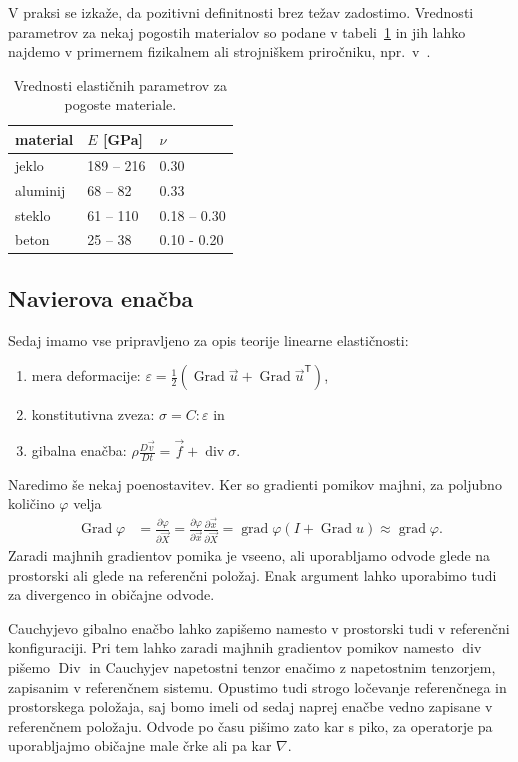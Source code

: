 \documentclass[12pt,a4paper,twoside]{article}
\theoremstyle{definition} %
\theoremstyle{plain} %
\numberwithin{equation}{section}
\newcommand{\T}{\mathsf{T}}
\renewcommand{\div}{\operatorname{div}}
\newcommand{\grad}{\operatorname{grad}}
\newcommand{\Div}{\operatorname{Div}}
\newcommand{\Grad}{\operatorname{Grad}}
\renewcommand{\phi}{\varphi}
\newcommand{\eps}{\varepsilon}
\newcommand{\dpar}[2]{\ensuremath{\frac{\partial #1}{\partial #2}}}
\newcommand{\DD}[2]{\ensuremath{\frac{D #1}{D #2}}}
\newcommand{\DDt}[1]{\DD{#1}{t}}
\newcommand{\vv}{\vec{v}}
\newcommand{\vu}{\vec{u}}
\newcommand{\vf}{\vec{f}}
\newcommand{\vX}{\vec{X}}
\newcommand{\vx}{\vec{x}}
\newcommand{\ts}{\sigma}
\begin{document}
V praksi se izkaže, da pozitivni definitnosti brez težav zadostimo. Vrednosti parametrov za nekaj
pogostih materialov so podane v tabeli~\ref{tab:Enu} in jih lahko najdemo v primernem fizikalnem ali
strojniškem priročniku, npr.~v~\cite[str.\ 11]{cambridge2003materials}.
\begin{table}[h]
  \centering
  \begin{tabular}{|l|l|l|} \hline
    material & $E$ [\unit{GPa}] & $\nu$ \\ \hline
    jeklo    & 189 -- 216 & 0.30 \\
    aluminij & 68 -- 82   & 0.33 \\
    steklo   & 61 -- 110  & 0.18 -- 0.30 \\
    beton    & 25 -- 38   & 0.10 - 0.20 \\ \hline
  \end{tabular}
  \caption{Vrednosti elastičnih parametrov za pogoste materiale.}
  \label{tab:Enu}
\end{table}

\subsection{Navierova enačba}
Sedaj imamo vse pripravljeno za opis teorije linearne elastičnosti:
\begin{enumerate}[\indent (1)]
  \item mera deformacije: $\eps = \frac12(\Grad \vu + \Grad \vu^\T)$,
  \item konstitutivna zveza: $\ts = C : \eps$ in
  \item gibalna enačba: $\rho \DDt{\vv} = \vf + \div \ts$.
\end{enumerate}

Naredimo še nekaj poenostavitev. Ker so gradienti pomikov majhni,
za poljubno količino $\phi$ velja
\begin{align}
  \Grad\phi &= \dpar{\phi}{\vX} = \dpar{\phi}{\vx} \dpar{\vx}{\vX} = \grad\phi
  (I + \Grad u) \approx \grad \phi.
\end{align}
Zaradi majhnih gradientov pomika je vseeno, ali uporabljamo odvode glede na
prostorski ali glede na referenčni položaj. Enak argument lahko uporabimo
tudi za divergenco in običajne odvode.

Cauchyjevo gibalno enačbo lahko zapišemo namesto v prostorski tudi v referenčni
konfiguraciji. Pri tem lahko zaradi majhnih gradientov pomikov namesto $\div$
pišemo $\Div$ in Cauchyjev napetostni tenzor enačimo z napetostnim tenzorjem,
zapisanim v referenčnem sistemu. Opustimo tudi strogo ločevanje referenčnega in
prostorskega položaja, saj bomo imeli od sedaj naprej enačbe vedno zapisane v
referenčnem položaju. Odvode po času pišimo zato kar s piko, za operatorje pa
uporabljajmo običajne male črke ali pa kar $\nabla$.
\end{document}
